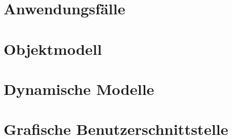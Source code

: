 \section{Anwendungsfälle}
%
%


\section{Objektmodell}
\section{Dynamische Modelle}
\section{Grafische Benutzerschnittstelle}